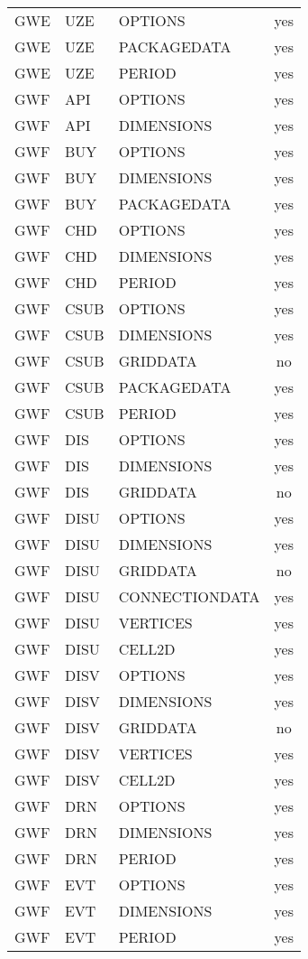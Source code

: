 \begin{longtable}{p{1.5cm} p{1.5cm} p{3cm} c}
\hline
GWE & UZE & OPTIONS & yes \\ 
GWE & UZE & PACKAGEDATA & yes \\ 
GWE & UZE & PERIOD & yes \\ 
\hline
GWF & API & OPTIONS & yes \\ 
GWF & API & DIMENSIONS & yes \\ 
\hline
GWF & BUY & OPTIONS & yes \\ 
GWF & BUY & DIMENSIONS & yes \\ 
GWF & BUY & PACKAGEDATA & yes \\ 
\hline
GWF & CHD & OPTIONS & yes \\ 
GWF & CHD & DIMENSIONS & yes \\ 
GWF & CHD & PERIOD & yes \\ 
\hline
GWF & CSUB & OPTIONS & yes \\ 
GWF & CSUB & DIMENSIONS & yes \\ 
GWF & CSUB & GRIDDATA & no \\ 
GWF & CSUB & PACKAGEDATA & yes \\ 
GWF & CSUB & PERIOD & yes \\ 
\hline
GWF & DIS & OPTIONS & yes \\ 
GWF & DIS & DIMENSIONS & yes \\ 
GWF & DIS & GRIDDATA & no \\ 
\hline
GWF & DISU & OPTIONS & yes \\ 
GWF & DISU & DIMENSIONS & yes \\ 
GWF & DISU & GRIDDATA & no \\ 
GWF & DISU & CONNECTIONDATA & yes \\ 
GWF & DISU & VERTICES & yes \\ 
GWF & DISU & CELL2D & yes \\ 
\hline
GWF & DISV & OPTIONS & yes \\ 
GWF & DISV & DIMENSIONS & yes \\ 
GWF & DISV & GRIDDATA & no \\ 
GWF & DISV & VERTICES & yes \\ 
GWF & DISV & CELL2D & yes \\ 
\hline
GWF & DRN & OPTIONS & yes \\ 
GWF & DRN & DIMENSIONS & yes \\ 
GWF & DRN & PERIOD & yes \\ 
\hline
GWF & EVT & OPTIONS & yes \\ 
GWF & EVT & DIMENSIONS & yes \\ 
GWF & EVT & PERIOD & yes \\ 

\end{longtable}
